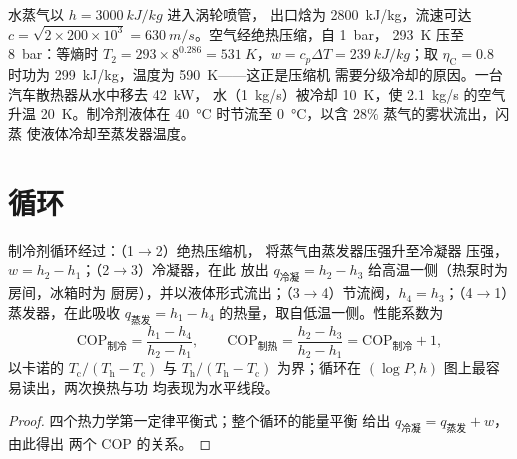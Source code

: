 \begin{example}[设备的数值计算]\label{ex:b2:open-systems:numbers}
水蒸气以 $h = \qty{3000}{kJ/kg}$ 进入涡轮喷管，
出口焓为 \qty{2800}{kJ/kg}，流速可达 $c = \sqrt{2 \times 200 \times 10^3} =
\qty{630}{m/s}$。空气经绝热压缩，自 \qty{1}{bar}，
\qty{293}{K} 压至 \qty{8}{bar}：等熵时 $T_2 = 293 \times 8^{0.286} =
\qty{531}{K}$，$w = c_p\Delta T = \qty{239}{kJ/kg}$；取 $\eta_{\text{C}} =
0.8$ 时功为 \qty{299}{kJ/kg}，温度为 \qty{590}{K}——这正是压缩机
需要分级冷却的原因。一台汽车散热器从水中移去 \qty{42}{kW}，
水（\qty{1}{kg/s}）被冷却 \qty{10}{K}，使 \qty{2.1}{kg/s} 的空气
升温 \qty{20}{K}。制冷剂液体在 \qty{40}{\celsius} 时节流至
\qty{0}{\celsius}，以含 $28\%$ 蒸气的雾状流出，闪蒸
使液体冷却至蒸发器温度。
\end{example}

\section{循环}

\begin{proposition}[蒸气压缩制冷与热泵]\label{prop:b2:open-systems:fridge}
制冷剂循环经过：（1$\to$2）绝热压缩机，
将蒸气由蒸发器压强升至冷凝器
压强，$w = h_2 - h_1$；（2$\to$3）冷凝器，在此
放出 $q_{\text{冷凝}} = h_2 - h_3$ 给高温一侧（热泵时为房间，冰箱时为
厨房），并以液体形式流出；（3$\to$4）节流阀，$h_4
= h_3$；（4$\to$1）蒸发器，在此吸收 $q_{\text{蒸发}} = h_1 - h_4$
的热量，取自低温一侧。性能系数为
\[
\mathrm{COP}_{\text{制冷}} = \frac{h_1 - h_4}{h_2 - h_1}, \qquad
\mathrm{COP}_{\text{制热}} = \frac{h_2 - h_3}{h_2 - h_1} = \mathrm{COP}_{\text{制冷}} + 1 ,
\]
以卡诺的 $T_{\text{c}}/(T_{\text{h}} - T_{\text{c}})$ 与
$T_{\text{h}}/(T_{\text{h}} - T_{\text{c}})$ 为界；循环在
$(\log P, h)$ 图上最容易读出，两次换热与功
均表现为水平线段。
\end{proposition}

\begin{proof}
四个热力学第一定律平衡式；整个循环的能量平衡
给出 $q_{\text{冷凝}} = q_{\text{蒸发}} + w$，由此得出
两个 COP 的关系。
\end{proof}

